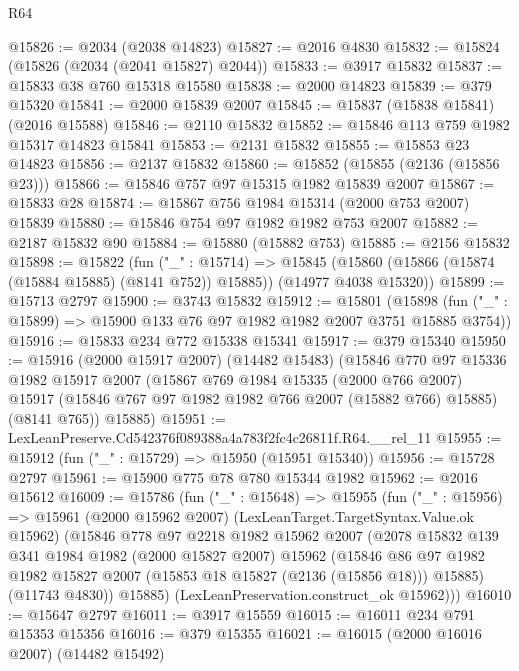 \begin{lexlean}{R64}
\begin{coremodule}
@15826 := @2034 (@2038 @14823)
@15827 := @2016 @4830
@15832 := @15824 (@15826 (@2034 (@2041 @15827) @2044))
@15833 := @3917 @15832
@15837 := @15833 @38 @760 @15318 @15580
@15838 := @2000 @14823
@15839 := @379 @15320
@15841 := @2000 @15839 @2007
@15845 := @15837 (@15838 @15841) (@2016 @15588)
@15846 := @2110 @15832
@15852 := @15846 @113 @759 @1982 @15317 @14823 @15841
@15853 := @2131 @15832
@15855 := @15853 @23 @14823
@15856 := @2137 @15832
@15860 := @15852 (@15855 (@2136 (@15856 @23)))
@15866 := @15846 @757 @97 @15315 @1982 @15839 @2007
@15867 := @15833 @28
@15874 := @15867 @756 @1984 @15314 (@2000 @753 @2007) @15839
@15880 := @15846 @754 @97 @1982 @1982 @753 @2007
@15882 := @2187 @15832 @90
@15884 := @15880 (@15882 @753)
@15885 := @2156 @15832
@15898 := @15822
    (fun ("_" : @15714) =>
    @15845 (@15860 (@15866 (@15874 (@15884 @15885) (@8141 @752)) @15885)) (@14977 @4038 @15320))
@15899 := @15713 @2797
@15900 := @3743 @15832
@15912 := @15801
    (@15898 (fun ("_" : @15899) => @15900 @133 @76 @97 @1982 @1982 @2007 @3751 @15885 @3754))
@15916 := @15833 @234 @772 @15338 @15341
@15917 := @379 @15340
@15950 := @15916
    (@2000 @15917 @2007)
    (@14482 @15483)
    (@15846
      @770
      @97
      @15336
      @1982
      @15917
      @2007
      (@15867
        @769
        @1984
        @15335
        (@2000 @766 @2007)
        @15917
        (@15846 @767 @97 @1982 @1982 @766 @2007 (@15882 @766) @15885)
        (@8141 @765))
      @15885)
@15951 := LexLeanPreserve.Cd542376f089388a4a783f2fc4c26811f.R64.__rel_11
@15955 := @15912 (fun ("_" : @15729) => @15950 (@15951 @15340))
@15956 := @15728 @2797
@15961 := @15900 @775 @78 @780 @15344 @1982
@15962 := @2016 @15612
@16009 := @15786
    (fun ("_" : @15648) =>
    @15955
      (fun ("_" : @15956) =>
      @15961
        (@2000 @15962 @2007)
        (LexLeanTarget.TargetSyntax.Value.ok @15962)
        (@15846
          @778
          @97
          @2218
          @1982
          @15962
          @2007
          (@2078
            @15832
            @139
            @341
            @1984
            @1982
            (@2000 @15827 @2007)
            @15962
            (@15846
              @86
              @97
              @1982
              @1982
              @15827
              @2007
              (@15853 @18 @15827 (@2136 (@15856 @18)))
              @15885)
            (@11743 @4830))
          @15885)
        (LexLeanPreservation.construct_ok @15962)))
@16010 := @15647 @2797
@16011 := @3917 @15559
@16015 := @16011 @234 @791 @15353 @15356
@16016 := @379 @15355
@16021 := @16015 (@2000 @16016 @2007) (@14482 @15492)

\end{coremodule}
\end{lexlean}
